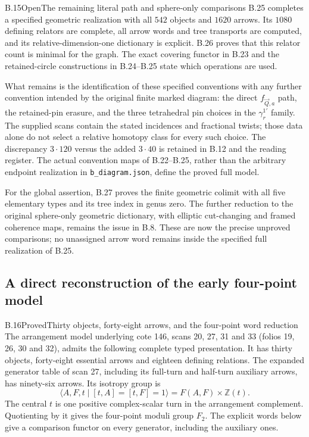 \begin{result}{B.15}{Open}{The remaining literal path and sphere-only comparisons}
B.25 completes a specified geometric realization with all
$542$ objects and $1620$ arrows.  Its $1080$ defining relators
are complete, all arrow words and tree transports are computed,
and its relative-dimension-one dictionary is explicit.
B.26 proves that this relator count is minimal for the graph.
The exact covering functor in B.23 and the retained-circle
constructions in B.24--B.25 state which operations are used.

What remains is the identification of these specified conventions
with any further convention intended by the original finite
marked diagram: the direct $f_{\vec Q,a}$ path, the retained-pin
erasure, and the three tetrahedral pin choices in the
$\gamma_r^{1'}$ family.  The supplied scans contain the stated
incidences and fractional twists; those data alone do not
select a relative homotopy class for every such choice.
The discrepancy $3\cdot120$ versus the added $3\cdot40$ is
retained in B.12 and the reading register.  The actual convention
maps of B.22--B.25, rather than the arbitrary endpoint realization
in \texttt{b\_diagram.json}, define the proved full model.

For the global assertion, B.27 proves the finite geometric
colimit with all five elementary types and its tree index in
genus zero.  The further reduction to the original sphere-only
geometric dictionary, with elliptic cut-changing and framed
coherence maps, remains the issue in B.8.  These are now the
precise unproved comparisons; no unassigned arrow word remains
inside the specified full realization of B.25.
\end{result}

\subsection{A direct reconstruction of the early four-point model}

\begin{result}{B.16}{Proved}{Thirty objects, forty-eight arrows, and the four-point word reduction}
The arrangement model underlying cote 146, scans 20, 27, 31 and
33 (folios 19, 26, 30 and 32), admits the following complete typed
presentation.  It has thirty objects, forty-eight essential
arrows and eighteen defining relations.  The expanded generator
table of scan 27, including its full-turn and half-turn auxiliary
arrows, has ninety-six arrows.  Its isotropy group is
\[
 \langle A,F,t\mid[t,A]=[t,F]=1\rangle=F(A,F)\times\mathbb Z(t).
 \tag{B.19}
\]
The central $t$ is one positive complex-scalar turn in the
arrangement complement.  Quotienting by it gives the four-point
moduli group $F_2$.  The explicit words below give a comparison
functor on every generator, including the auxiliary ones.
\end{result}

